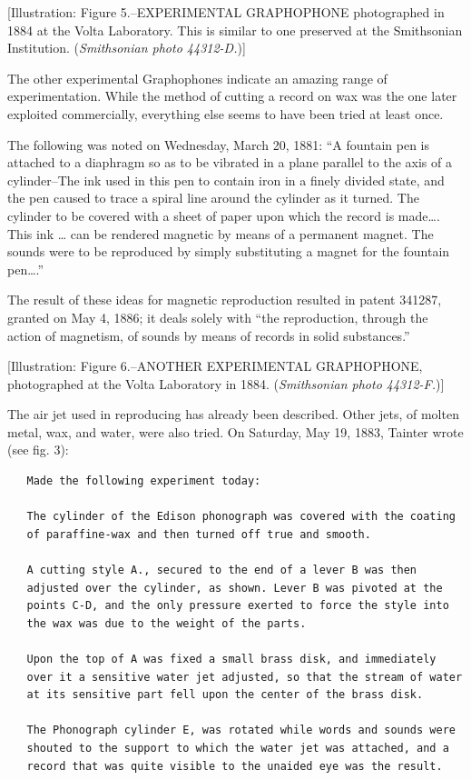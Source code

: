 \documentclass[12pt,oneside]{scrbook}
\begin{document}
  {[}Illustration: Figure 5.--EXPERIMENTAL GRAPHOPHONE photographed in
  1884 at the Volta Laboratory. This is similar to one preserved at the
  Smithsonian Institution. (\emph{Smithsonian photo 44312-D.}){]}
  
  The other experimental Graphophones indicate an amazing range of
  experimentation. While the method of cutting a record on wax was the one
  later exploited commercially, everything else seems to have been tried
  at least once.
  
  The following was noted on Wednesday, March 20, 1881: ``A fountain pen
  is attached to a diaphragm so as to be vibrated in a plane parallel to
  the axis of a cylinder--The ink used in this pen to contain iron in a
  finely divided state, and the pen caused to trace a spiral line around
  the cylinder as it turned. The cylinder to be covered with a sheet of
  paper upon which the record is made\ldots{}. This ink \ldots{} can be
  rendered magnetic by means of a permanent magnet. The sounds were to be
  reproduced by simply substituting a magnet for the fountain
  pen\ldots{}.''
  
  The result of these ideas for magnetic reproduction resulted in patent
  341287, granted on May 4, 1886; it deals solely with ``the reproduction,
  through the action of magnetism, of sounds by means of records in solid
  substances.''
  
  {[}Illustration: Figure 6.--ANOTHER EXPERIMENTAL GRAPHOPHONE,
  photographed at the Volta Laboratory in 1884. (\emph{Smithsonian photo
  44312-F.}){]}
  
  The air jet used in reproducing has already been described. Other jets,
  of molten metal, wax, and water, were also tried. On Saturday, May 19,
  1883, Tainter wrote (see fig. 3):
  
  \begin{verbatim}
   Made the following experiment today:
  
   The cylinder of the Edison phonograph was covered with the coating
   of paraffine-wax and then turned off true and smooth.
  
   A cutting style A., secured to the end of a lever B was then
   adjusted over the cylinder, as shown. Lever B was pivoted at the
   points C-D, and the only pressure exerted to force the style into
   the wax was due to the weight of the parts.
  
   Upon the top of A was fixed a small brass disk, and immediately
   over it a sensitive water jet adjusted, so that the stream of water
   at its sensitive part fell upon the center of the brass disk.
  
   The Phonograph cylinder E, was rotated while words and sounds were
   shouted to the support to which the water jet was attached, and a
   record that was quite visible to the unaided eye was the result.
  \end{verbatim}
  
\end{document}
